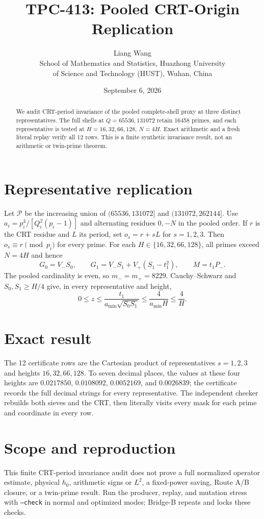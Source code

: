 \documentclass[11pt]{article}
\title{TPC-413: Pooled CRT-Origin Replication}
\author{Liang Wang\\School of Mathematics and Statistics, Huazhong University\\of Science and Technology (HUST), Wuhan, China}
\date{September 6, 2026}
\begin{document}
\maketitle
\begin{abstract}
We audit CRT-period invariance of the pooled complete-shell proxy at three
distinct representatives.  The full shells at $Q=65536,131072$ retain 16458
primes, and each representative is tested at $H=16,32,66,128$, $N=4H$.
Exact arithmetic and a fresh literal replay verify all 12 rows.  This is a
finite synthetic invariance result, not an arithmetic or twin-prime theorem.
\end{abstract}
\section{Representative replication}
Let $\mathcal P$ be the increasing union of $(65536,131072]$ and
$(131072,262144]$.  Use $a_i=p_i^3/[Q_i^2(p_i-1)]$ and alternating residues
$0,-N$ in the pooled order.  If $r$ is the CRT residue and $L$ its period, set
$o_s=r+sL$ for $s=1,2,3$.  Then $o_s\equiv r\pmod {p_i}$ for every prime.
For each $H\in\{16,32,66,128\}$, all primes exceed $N=4H$ and hence
\[
G_0=V_-S_0,\qquad G_1=V_-S_1+V_+(S_1-t_1^2),\qquad M=t_1P_-.
\]
The pooled cardinality is even, so $m_-=m_+=8229$.  Cauchy--Schwarz and
$S_0,S_1\ge H/4$ give, in every representative and height,
\[
0\le z\le\frac{t_1}{a_{\min}\sqrt{S_0S_1}}\le\frac4{a_{\min}H}\le\frac4H.\tag{1}
\]
\section{Exact result}
The 12 certificate rows are the Cartesian product of representatives
$s=1,2,3$ and heights $16,32,66,128$.  To seven decimal places, the values at
these four heights are $0.0217850$, $0.0108092$, $0.0052169$, and $0.0026839$;
the certificate records the full decimal strings for every representative.
The independent checker rebuilds both sieves and the CRT, then literally
visits every mask for each prime and coordinate in every row.
\section{Scope and reproduction}
This finite CRT-period invariance audit does not prove a full normalized
operator estimate, physical $h_0$, arithmetic signs or $L^2$, a fixed-power
saving, Route A/B closure, or a twin-prime result.  Run the producer, replay,
and mutation stress with \texttt{--check} in normal and optimized modes;
Bridge-B repeats and locks these checks.
\end{document}
